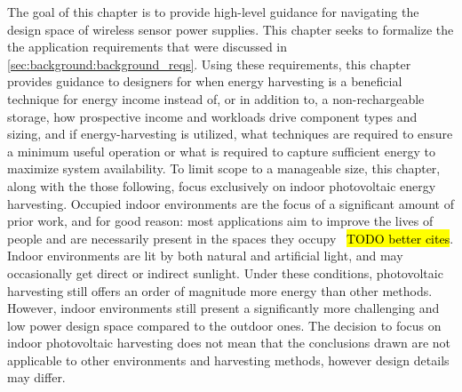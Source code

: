 The goal of this chapter is to provide high-level guidance for navigating the design space of wireless sensor power supplies. 
This chapter seeks to formalize the the application requirements that were discussed in 
\cref{sec:background:background_reqs}.
Using these requirements, this chapter provides guidance to designers for when energy harvesting is a beneficial technique for energy income instead of, or in addition to, a non-rechargeable storage, how prospective income and workloads drive component types and sizing, and if energy-harvesting is utilized, what techniques are required to ensure a minimum useful operation or what is required to capture sufficient energy to maximize system availability. 
To limit scope to a manageable size, 
this chapter, along with the those following, focus exclusively on indoor photovoltaic energy harvesting.
Occupied indoor environments are the focus of a significant
amount of
prior work, 
and for good reason: most
applications aim to improve the lives of people and are necessarily present
in the spaces they occupy~\cite{hesterTimely17,hesterFlicker17,colinReconfigurable18,campbellEnergy14} \hl{TODO better cites}.
Indoor environments are lit by both natural and artificial light, 
and may occasionally get direct or indirect sunlight. 
Under these conditions, photovoltaic harvesting still offers an order of magnitude more energy than other methods.
However, indoor environments still present a significantly more challenging and low power design space compared to the outdoor ones. 
The decision to focus on indoor photovoltaic harvesting does not mean that the conclusions drawn are not applicable to other
environments and harvesting methods, however design details may differ. 

